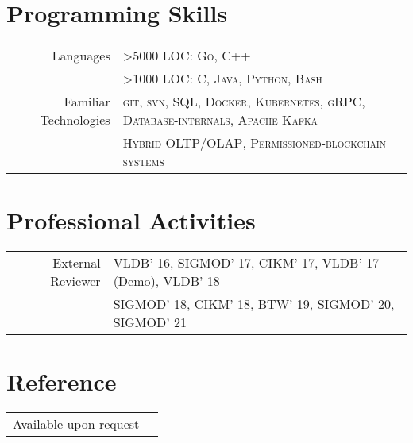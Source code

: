 \documentclass[a4paper,10pt]{article} %
\begin{document}
\section{Programming Skills}
\vspace*{0.2cm}
\begin{tabular}{rl}
Languages & >5000 LOC: \textsc{Go}, \textsc{C++}\\
		  & >1000 LOC: \textsc{C}, \textsc{Java}, \textsc{Python}, \textsc{Bash}\\
		  
Familiar Technologies & \textsc{git},  \textsc{svn},  \textsc{SQL},  \textsc{Docker},  \textsc{Kubernetes}, \textsc{gRPC}, \textsc{Database-internals}, \textsc{Apache Kafka}\\
& \textsc{Hybrid OLTP/OLAP}, \textsc{Permissioned-blockchain systems}
\end{tabular}

\section{Professional Activities}
\vspace*{0.2cm}
\begin{tabular}{rl}
External Reviewer & VLDB' 16, SIGMOD' 17, CIKM' 17, VLDB' 17 (Demo), VLDB' 18\\
& SIGMOD' 18, CIKM' 18, BTW' 19, SIGMOD' 20, SIGMOD' 21
\end{tabular}

\section{Reference}
\vspace*{0.2cm}
\begin{tabular}{rl}
	Available upon request\\
\end{tabular}
\end{document}
